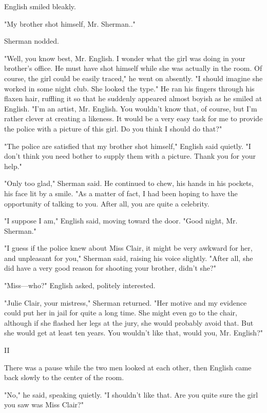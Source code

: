 \documentclass{novel}
\begin{document}
English smiled bleakly.

"My brother shot himself, Mr. Sherman.."

Sherman nodded.

"Well, you know best, Mr. English. I wonder what the girl was doing in your brother's office. He must have shot himself while she was actually in the room. Of course, the girl could be easily traced," he went on absently. "I should imagine she worked in some night club. She looked the type." He ran his fingers through his flaxen hair, ruffling it so that he suddenly appeared almost boyish as he smiled at English. "I'm an artist, Mr. English. You wouldn't know that, of course, but I'm rather clever at creating a likeness. It would be a very easy task for me to provide the police with a picture of this girl. Do you think I should do that?"

"The police are satisfied that my brother shot himself," English said quietly. "I don't think you need bother to supply them with a picture. Thank you for your help."

"Only too glad," Sherman said. He continued to chew, his hands in his pockets, his face lit by a smile. "As a matter of fact, I had been hoping to have the opportunity of talking to you. After all, you are quite a celebrity.

"I suppose I am," English said, moving toward the door. "Good night, Mr. Sherman."

"I guess if the police knew about Miss Clair, it might be very awkward for her, and unpleasant for you," Sherman said, raising his voice slightly. "After all, she did have a very good reason for shooting your brother, didn't she?"

"Miss—who?" English asked, politely interested.

"Julie Clair, your mistress," Sherman returned. "Her motive and my evidence could put her in jail for quite a long time. She might even go to the chair, although if she flashed her legs at the jury, she would probably avoid that. But she would get at least ten years. You wouldn't like that, would you, Mr. English?"



II

There was a pause while the two men looked at each other, then English came back slowly to the center of the room.

"No," he said, speaking quietly. "I shouldn't like that. Are you quite sure the girl you saw was Miss Clair?"
\end{document}
